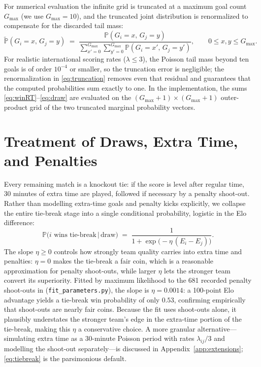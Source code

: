 \documentclass[11pt]{article}
\newcommand{\Prob}{\mathbb{P}}
\begin{document}
For numerical evaluation the infinite grid is truncated at a maximum goal
count $G_{\max}$ (we use $G_{\max} = 10$), and the truncated joint
distribution is renormalized to compensate for the discarded tail mass:
\begin{equation}
\widetilde{\Prob}(G_i = x,\, G_j = y)
\;=\;
\frac{\Prob(G_i = x,\, G_j = y)}
{\displaystyle\sum_{x'=0}^{G_{\max}}\sum_{y'=0}^{G_{\max}}
\Prob(G_i = x',\, G_j = y')},
\qquad 0 \le x, y \le G_{\max}.
\label{eq:truncation}
\end{equation}
For realistic international scoring rates ($\lambda \le 3$), the Poisson tail
mass beyond ten goals is of order $10^{-4}$ or smaller, so the truncation
error is negligible; the renormalization in \eqref{eq:truncation} removes even
that residual and guarantees that the computed probabilities sum exactly to
one. In the implementation, the sums
\eqref{eq:winRT}--\eqref{eq:draw} are evaluated on the
$(G_{\max}+1) \times (G_{\max}+1)$ outer-product grid of the two truncated
marginal probability vectors.

\section{Treatment of Draws, Extra Time, and Penalties}
\label{sec:draws}

Every remaining match is a knockout tie: if the score is level after regular
time, 30 minutes of extra time are played, followed if necessary by a penalty
shoot-out. Rather than modelling extra-time goals and penalty kicks
explicitly, we collapse the entire tie-break stage into a single conditional
probability, logistic in the Elo difference:
\begin{equation}
\Prob\bigl(i \text{ wins tie-break} \,\big|\, \text{draw}\bigr)
\;=\;
\frac{1}{1 + \exp\bigl(-\eta\,(E_i - E_j)\bigr)}.
\label{eq:tiebreak}
\end{equation}
The slope $\eta \ge 0$ controls how strongly team quality carries into extra
time and penalties: $\eta = 0$ makes the tie-break a fair coin, which is a
reasonable approximation for penalty shoot-outs, while larger $\eta$ lets the
stronger team convert its superiority. Fitted by maximum likelihood to the
681 recorded penalty shoot-outs in \cite{martj42results}
(\texttt{fit\_parameters.py}), the slope is $\eta = 0.0014$: a 100-point Elo
advantage yields a tie-break win probability of only $0.53$, confirming
empirically that shoot-outs are nearly fair coins. Because the fit uses
shoot-outs alone, it plausibly understates the stronger team's edge in the
extra-time portion of the tie-break, making this $\eta$ a conservative
choice. A more granular alternative---simulating extra time as a 30-minute
Poisson period with rates $\lambda_{ij}/3$ and modelling the shoot-out
separately---is discussed in Appendix~\ref{app:extensions};
\eqref{eq:tiebreak} is the parsimonious default.
\end{document}
